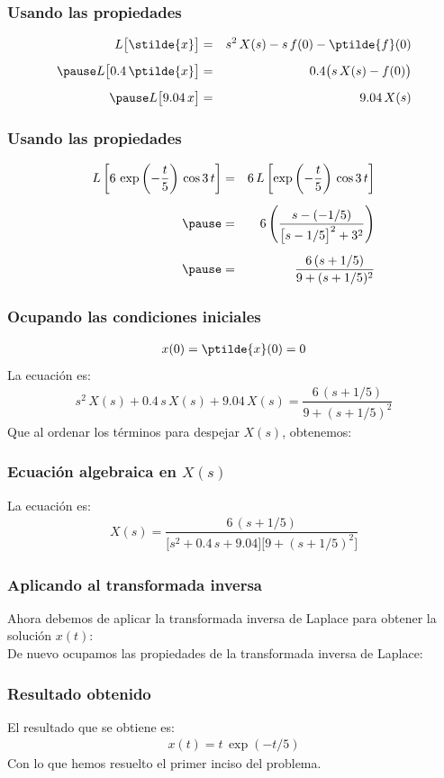 \begin{frame}
\frametitle{Usando las propiedades}
\begin{eqnarray*}
L \big[\stilde{x}\big] &=& s^{2} \, X(s) - s \, f(0) - \ptilde{f}(0) \\[0.5em] \pause
L \big[0.4 \, \ptilde{x}\big] &=& 0. 4 \big( s \, X(s) - f(0)\big) \\[0.5em] \pause
L \big[9.04 \, x\big] &=& 9.04 \, X(s)
\end{eqnarray*}
\end{frame}
\begin{frame}
\frametitle{Usando las propiedades}
\begin{eqnarray*}
L \left[ 6 \, \exp \left( -\dfrac{t}{5}\right) \, \cos 3 \, t \right] &=& 6 \, L \left[\exp \left( -\dfrac{t}{5}\right) \, \cos 3 \, t \right] \\[0.5em] \pause
&=& 6 \left( \dfrac{s - (-1/5)}{\big[s - 1/5\big]^{2} + 3^{2}} \right) \\[0.5em] \pause
&=& \dfrac{6 \, (s + 1/5)}{9 + (s + 1/5)^{2}}
\end{eqnarray*}
\end{frame}
\begin{frame}
\frametitle{Ocupando las condiciones iniciales}
\begin{align*}
x(0) = \ptilde{x}(0) = 0
\end{align*}
\pause
La ecuación es:
\begin{align*}
s^{2} \, X(s) + 0.4 \, s \, X(s) + 9.04 \, X(s) = \dfrac{6 \, (s + 1/5)}{9 + (s + 1/5)^{2}}
\end{align*}
\pause
Que al ordenar los términos para despejar $X(s)$, obtenemos:
\end{frame}
\begin{frame}
\frametitle{Ecuación algebraica en $X(s)$}
La ecuación es:
\begin{align*}
X(s) = \dfrac{6 \, (s + 1/5)}{\big[s^{2} + 0.4 \, s + 9.04\big] \big[9 + (s + 1/5)^{2}\big]}
\end{align*}
\end{frame}
\begin{frame}
\frametitle{Aplicando al transformada inversa}
Ahora debemos de aplicar la transformada inversa de Laplace para obtener la solución $x(t)$:
\\
\bigskip
\pause
De nuevo ocupamos las propiedades de la transformada inversa de Laplace:
\end{frame}
\begin{frame}
\frametitle{Resultado obtenido}
El resultado que se obtiene es:
\pause
\begin{align*}
x(t) = t \, \exp (-t/5)
\end{align*}
Con lo que hemos resuelto el primer inciso del problema.
\end{frame}
